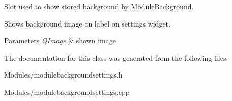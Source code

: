 Slot used to show stored background by \hyperlink{class_module_background}{ModuleBackground}. 

Shows background image on label on settings widget. 
\begin{DoxyParams}{Parameters}
{\em QImage} & shown image \\
\hline
\end{DoxyParams}


The documentation for this class was generated from the following files:\begin{DoxyCompactItemize}
\item 
Modules/modulebackgroundsettings.h\item 
Modules/modulebackgroundsettings.cpp\end{DoxyCompactItemize}
